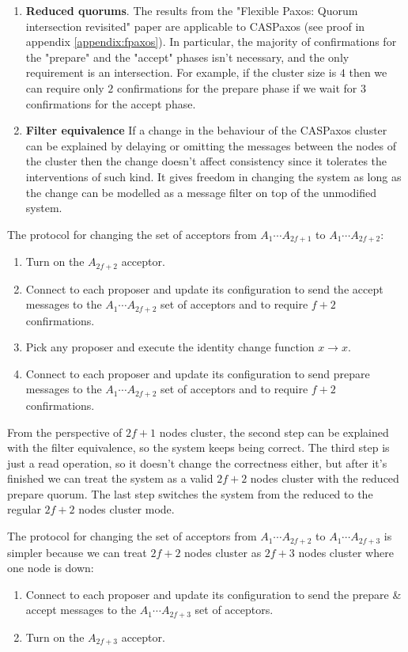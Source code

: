 \documentclass[12pt]{article}
\begin{document}
\begin{enumerate}
  \item {\bf Reduced quorums}. The results from the "Flexible Paxos: Quorum intersection revisited"\cite{fpaxos} paper are applicable to CASPaxos (see proof in appendix \ref{appendix:fpaxos}). In particular, the majority of confirmations for the "prepare" and the "accept" phases isn't necessary, and the only requirement is an intersection. For example, if the cluster size is $4$ then we can require only $2$ confirmations for the prepare phase if we wait for $3$ confirmations for the accept phase.
  
  \item {\bf Filter equivalence} If a change in the behaviour of the CASPaxos cluster can be explained by delaying or omitting the messages between the nodes of the cluster then the change doesn't affect consistency since it tolerates the interventions of such kind. It gives freedom in changing the system as long as the change can be modelled as a message filter on top of the unmodified system.
\end{enumerate}

The protocol for changing the set of acceptors from $A_1 \cdots A_{2f+1}$ to $A_1 \cdots A_{2f+2}$:
\begin{enumerate}
  \item Turn on the $A_{2f+2}$ acceptor.
  \item Connect to each proposer and update its configuration to send the accept messages to the $A_1 \cdots A_{2f+2}$ set of acceptors and to require $f+2$ confirmations.
  \item Pick any proposer and execute the identity change function $x \to x$.
  \item Connect to each proposer and update its configuration to send prepare messages to the $A_1 \cdots A_{2f+2}$ set of acceptors and to require $f+2$ confirmations.
\end{enumerate}

From the perspective of $2f+1$ nodes cluster, the second step can be explained with the filter equivalence, so the system keeps being correct. The third step is just a read operation, so it doesn't change the correctness either, but after it's finished we can treat the system as a valid $2f+2$ nodes cluster with the reduced prepare quorum. The last step switches the system from the reduced to the regular $2f+2$ nodes cluster mode.

The protocol for changing the set of acceptors from $A_1 \cdots A_{2f+2}$ to $A_1 \cdots A_{2f+3}$ is simpler because we can treat $2f+2$ nodes cluster as $2f+3$ nodes cluster where one node is down:
\begin{enumerate}
  \item Connect to each proposer and update its configuration to send the prepare \& accept messages to the $A_1 \cdots A_{2f+3}$ set of acceptors.
  \item Turn on the $A_{2f+3}$ acceptor.
\end{enumerate}
\end{document}
